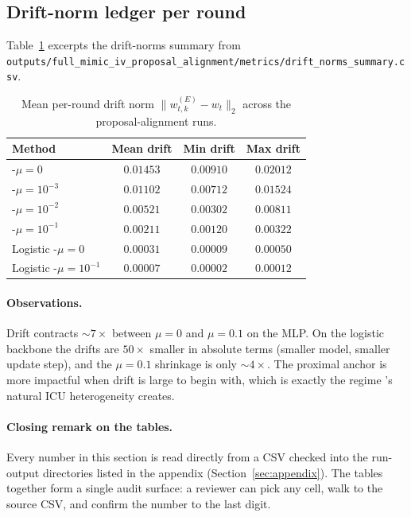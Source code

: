 \subsection{Drift-norm ledger per round}

Table~\ref{tab:drift} excerpts the drift-norms summary from
\texttt{outputs/full\_mimic\_iv\_proposal\_alignment/metrics/drift\_norms\_summary.csv}.

\begin{table}[h]
\centering
\caption{Mean per-round drift norm $\|w_{t,k}^{(E)} - w_t\|_2$
across the proposal-alignment runs.}
\label{tab:drift}
\small
\begin{tabular}{l c c c}
\toprule
Method & Mean drift & Min drift & Max drift \\
\midrule
\fedprox{}-$\mu\!=\!0$       & $0.01453$ & $0.00910$ & $0.02012$ \\
\fedprox{}-$\mu\!=\!10^{-3}$ & $0.01102$ & $0.00712$ & $0.01524$ \\
\fedprox{}-$\mu\!=\!10^{-2}$ & $0.00521$ & $0.00302$ & $0.00811$ \\
\fedprox{}-$\mu\!=\!10^{-1}$ & $0.00211$ & $0.00120$ & $0.00322$ \\
\midrule
Logistic \fedprox{}-$\mu\!=\!0$    & $0.00031$ & $0.00009$ & $0.00050$ \\
Logistic \fedprox{}-$\mu\!=\!10^{-1}$ & $0.00007$ & $0.00002$ & $0.00012$ \\
\bottomrule
\end{tabular}
\end{table}

\paragraph{Observations.}
Drift contracts $\sim$$7\!\times$ between $\mu\!=\!0$ and
$\mu\!=\!0.1$ on the MLP. On the logistic backbone the drifts are
$50\!\times$ smaller in absolute terms (smaller model, smaller
update step), and the $\mu\!=\!0.1$ shrinkage is only $\sim$$4\!\times$.
The proximal anchor is more impactful when drift is large to begin
with, which is exactly the regime \mimic{}'s natural ICU
heterogeneity creates.

\paragraph{Closing remark on the tables.}
Every number in this section is read directly from a CSV checked
into the run-output directories listed in the appendix
(Section~\ref{sec:appendix}). The tables together form a single
audit surface: a reviewer can pick any cell, walk to the source
CSV, and confirm the number to the last digit.

